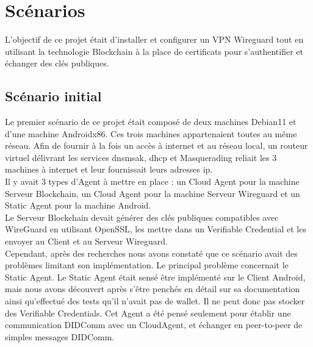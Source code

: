 \documentclass[12pt, openany]{report}
\begin{document}
\section{Scénarios}
L'objectif de ce projet était d'installer et configurer un VPN Wireguard tout en utilisant la technologie Blockchain à la place de certificats pour s'authentifier et échanger des clés publiques. 

\subsection{Scénario initial}
\noindent 
\begin{flushleft}
Le premier scénario de ce projet était composé de deux machines Debian11 et d'une machine Androidx86. Ces trois machines appartenaient toutes au même réseau. Afin de fournir à la fois un accès à internet et au réseau local, un routeur virtuel délivrant les services dnsmsak, dhcp et Masquerading reliait les 3 machines à internet et leur fournissait leurs adresses ip.\\
\vspace{2mm}
Il y avait 3 types d'Agent à mettre en place : un Cloud Agent pour la machine Serveur Blockchain, un Cloud Agent pour la machine Serveur Wireguard et un Static Agent pour la machine Android. \\
Le Serveur Blockchain devait générer des clés publiques compatibles avec WireGuard en utilisant OpenSSL, les mettre dans un Verifiable Credential et les envoyer au Client et au Serveur Wireguard. \\
Cependant, après des recherches nous avons constaté que ce scénario avait des problèmes limitant son implémentation. Le principal problème concernait le Static Agent. Le Static Agent était sensé être implémenté sur le Client Android, mais nous avons découvert après s'être penchés en détail sur sa documentation ainsi qu'effectué des tests qu'il n'avait pas de wallet. Il ne peut donc pas stocker des Verifiable Credentials. Cet Agent a été pensé seulement pour établir une communication DIDComm avec un CloudAgent, et échanger en peer-to-peer de simples messages DIDComm.
\end{flushleft}
\end{document}
